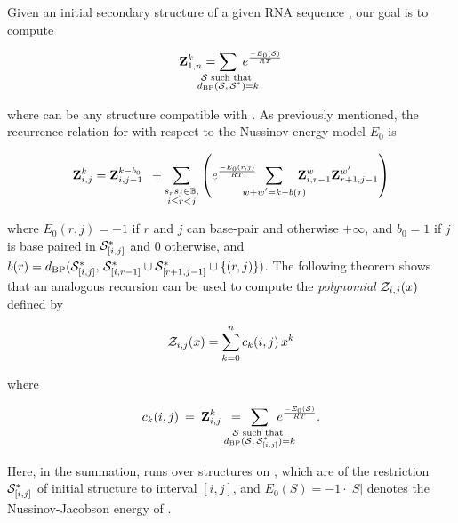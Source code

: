 Given an initial secondary structure \strSt of a
given RNA sequence \seq, our goal is to compute

\begin{align}
\label{eq:fftbor:defZofK}
\bfZ{k}{1,n} = \sum_{\mathclap{\substack{\str \text{ such that }\\ \dBP{\str}{\strSt}=k}}}\;
\boltzNuss{\str}
\end{align}

where \str can be any structure compatible with \seq.
As previously mentioned, the recurrence relation for \rnabor
with respect to the Nussinov energy model $E_0$ is

\begin{align}
\label{eq:fftbor:rnaborNuss}
\bfZ{k}{i,j} = \bfZ{k-b_0}{i,j-1}\enspace +
\sum_{\substack{s_r s_j \in \bpSet, \\ i \le r<j}}
\left(
\boltzNuss{r,j}\enspace \sum_{\mathclap{w+w'=k-b(r)}}\quad
\bfZ{w}{i,r-1} \bfZ{w'}{r+1,j-1}
\right)
\end{align}

where $E_0(r,j)=-1$ if $r$ and $j$ can base-pair and otherwise
$+\infty$, and
$b_0 = 1$ if $j$ is base paired in $\mathcal S^*_{[i,j]}$ and $0$ otherwise, and
$b(r)=d_{\text{BP}}(\mathcal S^*_{[i,j]},\,\mathcal S^*_{[i,r-1]} \cup \mathcal S^*_{[r+1,j-1]} \cup\{(r,j)\})$.
The following theorem shows that an analogous recursion can be used to compute
the {\em polynomial} ${\mathcal Z}_{i,j}(x)$ defined by

\begin{align}
\label{eq:fftbor:polynomialZij}
\emZ{i,j} = \sum_{k=0}^n c_k(i,j)\,x^k
\end{align}

where

\begin{align}
c_k(i,j)\>=\>
\bfZ{k}{i,j}\enspace=\enspace
\sum_{\mathclap{\substack{\str \text{ such that } \\
\dBP{\str}{\strSt_{[i,j]}}=k}}}\enspace
\boltzNuss{\str}.
\end{align}

Here, in the summation, \str runs over structures on \seqIJ, which
are \kNbrs of the restriction $\mathcal S^*_{[i,j]}$ of initial structure
\strSt to interval $[i,j]$, and
$E_0(S)=-1 \cdot |S|$ denotes the Nussinov-Jacobson energy of \str.

